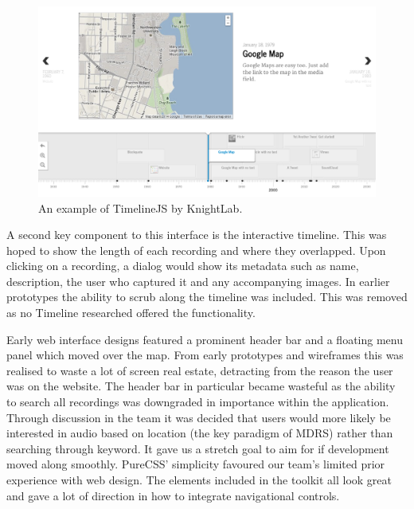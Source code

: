 \documentclass{l3proj}
\begin{document}
\begin{figure}[ht!]
\centering
\includegraphics[width=1\textwidth]{images/timeline-example.png}
\caption{An example of TimelineJS by KnightLab.}
\end{figure}

A second key component to this interface is the interactive timeline. This was hoped to show the length of each recording and where they overlapped. Upon clicking on a recording, a dialog would show its metadata such as name, description, the user who captured it and any accompanying images. In earlier prototypes the ability to scrub along the timeline was included. This was removed as no Timeline researched offered the functionality.

Early web interface designs featured a prominent header bar and a floating menu panel which moved over the map. From early prototypes and wireframes this was realised to waste a lot of screen real estate, detracting from the reason the user was on the website. The header bar in particular became wasteful as the ability to search all recordings was downgraded in importance within the application. Through discussion in the team it was decided that users would more likely be interested in audio based on location (the key paradigm of MDRS) rather than searching through keyword. It gave us a stretch goal to aim for if development moved along smoothly. PureCSS' simplicity favoured our team's limited prior experience with web design. The elements included in the toolkit all look great and gave a lot of direction in how to integrate navigational controls.
\end{document}

